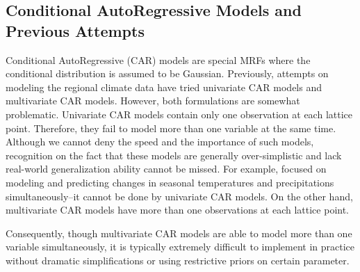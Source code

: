 \documentclass{article}
\begin{document}
\subsection{Conditional AutoRegressive Models and Previous Attempts}
Conditional AutoRegressive (CAR) models are special MRFs where the conditional distribution is assumed to be Gaussian. Previously, attempts on modeling the regional climate data have tried univariate CAR models and multivariate CAR models. However, both formulations are somewhat problematic. Univariate CAR models contain only one observation at each lattice point. Therefore, they fail to model more than one variable at the same time. Although we cannot deny the speed and the importance of such models, recognition on the fact that these models are generally over-simplistic and lack real-world generalization ability cannot be missed. For example, \cite{paper} focused on modeling and predicting changes in seasonal temperatures and precipitations simultaneously--it cannot be done by univariate CAR models. On the other hand, multivariate CAR models have more than one observations at each lattice point.

Consequently, though multivariate CAR models are able to model more than one variable simultaneously, it is typically extremely difficult to implement in practice without dramatic simplifications or using restrictive priors on certain parameter.

 

\end{document}
